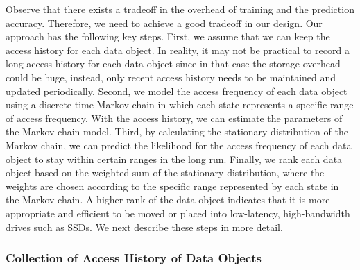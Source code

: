 %


Observe that there exists a tradeoff in the overhead of training and the prediction accuracy. Therefore, we need to achieve a good tradeoff in our design. Our approach has the following key steps. First, we assume that we can keep the access history for each data object. In reality, it may not be practical to record a long access history for each data object since in that case the storage overhead could be huge, instead, only recent access history needs to be maintained and updated periodically. Second, we model the access frequency of each data object using a discrete-time Markov chain in which each state represents a specific range of access frequency. With the access history, we can estimate the parameters of the Markov chain model. Third, by calculating the stationary distribution of the Markov chain, we can predict the likelihood for the access frequency of each data object to stay within certain ranges in the long run. Finally, we rank each data object based on the weighted sum of the stationary distribution, where the weights are chosen according to the specific range represented by each state in the Markov chain. A higher rank of the data object indicates that it is more appropriate and efficient to be moved or placed into low-latency, high-bandwidth drives such as SSDs. We next describe these steps in more detail.

\subsubsection{Collection of Access History of Data Objects}


